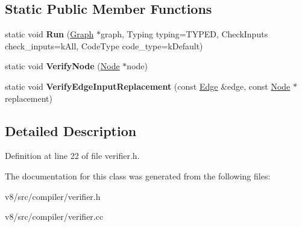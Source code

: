 \subsection*{Static Public Member Functions}
\begin{DoxyCompactItemize}
\item 
\mbox{\label{classv8_1_1internal_1_1compiler_1_1Verifier_a63a73b6c09545b61ee69aebb7f86c45a}} 
static void {\bfseries Run} (\mbox{\hyperlink{classv8_1_1internal_1_1compiler_1_1Graph}{Graph}} $\ast$graph, Typing typing=T\+Y\+P\+ED, Check\+Inputs check\+\_\+inputs=k\+All, Code\+Type code\+\_\+type=k\+Default)
\item 
\mbox{\label{classv8_1_1internal_1_1compiler_1_1Verifier_ad4ccd74b2c1820f3e00a863eb4d73515}} 
static void {\bfseries Verify\+Node} (\mbox{\hyperlink{classv8_1_1internal_1_1compiler_1_1Node}{Node}} $\ast$node)
\item 
\mbox{\label{classv8_1_1internal_1_1compiler_1_1Verifier_ab262c42f5331cbb6e489e73b310dac31}} 
static void {\bfseries Verify\+Edge\+Input\+Replacement} (const \mbox{\hyperlink{classv8_1_1internal_1_1compiler_1_1Edge}{Edge}} \&edge, const \mbox{\hyperlink{classv8_1_1internal_1_1compiler_1_1Node}{Node}} $\ast$replacement)
\end{DoxyCompactItemize}


\subsection{Detailed Description}


Definition at line 22 of file verifier.\+h.



The documentation for this class was generated from the following files\+:\begin{DoxyCompactItemize}
\item 
v8/src/compiler/verifier.\+h\item 
v8/src/compiler/verifier.\+cc\end{DoxyCompactItemize}
